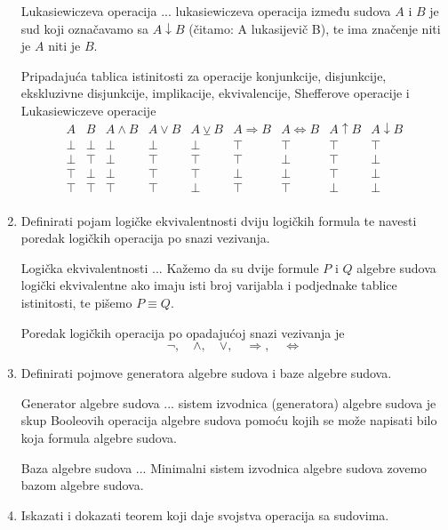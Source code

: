 \documentclass{article}
\begin{document}
\begin{enumerate}
Lukasiewiczeva operacija ... lukasiewiczeva operacija između sudova $A$ i $B$ je sud koji označavamo sa $A\downarrow B$ (čitamo: A lukasijevič B), te ima značenje niti je $A$ niti je $B$.

Pripadajuća tablica istinitosti za operacije konjunkcije, disjunkcije, ekskluzivne disjunkcije, implikacije, ekvivalencije, Shefferove operacije i Lukasiewiczeve operacije
\begin{displaymath}
\begin{array}{|c|c|c|c|c|c|c|c|c|}
A & B & A\land B & A\lor B & A\veebar B & A\Rightarrow B & A\Leftrightarrow B & A\uparrow B & A\downarrow B\\
\hline
\bot & \bot & \bot & \bot & \bot & \top & \top & \top & \top\\
\bot & \top & \bot & \top & \top & \top & \bot & \top & \bot\\
\top & \bot & \bot & \top & \top & \bot & \bot & \top & \bot\\
\top & \top & \top & \top & \bot & \top & \top & \bot & \bot\\
\end{array}
\end{displaymath}


\item Definirati pojam logičke ekvivalentnosti dviju logičkih formula te navesti poredak logičkih operacija po snazi vezivanja.

Logička ekvivalentnosti ... Kažemo da su dvije formule $P$ i $Q$ algebre sudova logički ekvivalentne ako imaju isti broj varijabla i podjednake tablice istinitosti, te pišemo $P\equiv Q$.

Poredak logičkih operacija po opadajućoj snazi vezivanja je
$$\neg,\quad\land,\quad\lor,\quad\Rightarrow,\quad\Leftrightarrow$$

\item Definirati pojmove generatora algebre sudova i baze algebre sudova.

Generator algebre sudova ... sistem izvodnica (generatora) algebre sudova je skup Booleovih operacija algebre sudova pomoću kojih se može napisati bilo koja formula algebre sudova.

Baza algebre sudova ... Minimalni sistem izvodnica algebre sudova zovemo bazom algebre sudova.

\item Iskazati i dokazati teorem koji daje svojstva operacija sa sudovima.


\end{enumerate}
\end{document}
